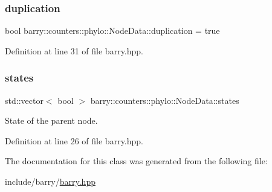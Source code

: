 \subsubsection{\texorpdfstring{duplication}{duplication}}
{\footnotesize\ttfamily bool barry\+::counters\+::phylo\+::\+Node\+Data\+::duplication = true}



Definition at line 31 of file barry.\+hpp.

\mbox{\label{classbarry_1_1counters_1_1phylo_1_1_node_data_a9a88332b03b6c78f386a1fafac660052}} 
\subsubsection{\texorpdfstring{states}{states}}
{\footnotesize\ttfamily std\+::vector$<$ bool $>$ barry\+::counters\+::phylo\+::\+Node\+Data\+::states}

State of the parent node. 

Definition at line 26 of file barry.\+hpp.



The documentation for this class was generated from the following file\+:\begin{DoxyCompactItemize}
\item 
include/barry/\hyperlink{barry_8hpp}{barry.\+hpp}\end{DoxyCompactItemize}
